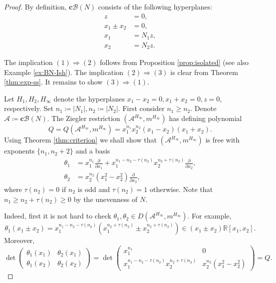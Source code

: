\documentclass[11pt]{article}
\theoremstyle{definition}
\numberwithin{equation}{section}
\newcommand{\A}{\mathcal{A}}
\newcommand{\B}{\mathcal{B}}
\newcommand{\R}{\mathbb{R}}
\newcommand{\tbf}{\textbf}
\begin{document}
\begin{proof}
By definition, $\tbf{c}\B(N)$ consists of the following hyperplanes: 
\begin{align*}
z &= 0 ,\\
x_{1}\pm x_{2}&= 0,\\
x_{1} &= N_1z , \\
x_{2} &= N_2z . 
\end{align*}

The implication $(1) \Rightarrow (2)$ follows from Proposition \ref{prop:isolated} (see also Example \ref{ex:BN-Ish}). 
The implication $(2) \Rightarrow (3)$ is clear from Theorem \ref{thm:exp-ss}. 
It remains to show $(3) \Rightarrow (1)$.
 
Let  $H_1,H_2,H_{\infty}$ denote the hyperplanes $x_1-x_2=0, x_1+x_2=0, z=0$, respectively. 
Set $n_1  \coloneqq |N_1|, n_2  \coloneqq  |N_2|$. 
First consider $n _1 \ge n_2$. 
Denote $ \mathcal{A}  \coloneqq \tbf{c}\B(N)$. 
The Ziegler restriction $(\A^{H_{\infty}}, m^{H_{\infty}})$ has defining polynomial 
$$Q = Q(\A^{H_{\infty}}, m^{H_{\infty}}) =x_{1}^{n_1}x_{2}^{n_2} (x_1-x_2)(x_1+x_2).$$
Using Theorem \ref{thm:criterion} we shall show that $(\A^{H_{\infty}}, m^{H_{\infty}})$ is free with  exponents $\{n_1,n_2+2\}$ and a basis
 \begin{align*}
\theta_1  & =x_{1}^{n_1} \frac{\partial}{\partial x_1} + x_{1}^{n_1-n_2-\tau(n_2)}  x_{2}^{n_2+\tau(n_2)}  \frac{\partial}{\partial x_2},\\
\theta_2  & = x_{2}^{n_2}  (x_1^2-x_2^2) \frac{\partial}{\partial x_2},
\end{align*}
where $\tau(n_2) = 0$ if $n_2$ is odd and $\tau(n_2) = 1$ otherwise. 
Note that $n_1\ge n_2+\tau(n_2) \ge 0$ by the unevenness of $N$.

Indeed, first it is not hard to check  $\theta_1, \theta_2 \in D(\A^{H_{\infty}}, m^{H_{\infty}})$. For example, 
$$\theta_1(x_{1}\pm x_{2}) =  x_{1}^{n_1-n_2-\tau(n_2)}(x_{1}^{n_2+\tau(n_2)} \pm  x_{2}^{n_2+\tau(n_2)}) \in (x_{1}\pm x_{2})\R[x_1,x_2]. $$
Moreover, 
$$
\det\begin{pmatrix}
\theta_1(x_{1}) & \theta_2(x_{1})\\
\theta_1(x_2) &\theta_2(x_2)
          \end{pmatrix}
          =
         \det \begin{pmatrix} x_{1}^{n_1} & 0\\
x_{1}^{n_1-n_2-\tau(n_2)}  x_{2}^{n_2+\tau(n_2)} &x_{2}^{n_2}  (x_1^2-x_2^2)
          \end{pmatrix}
     =Q.
       $$
       

\end{proof}
\end{document}
